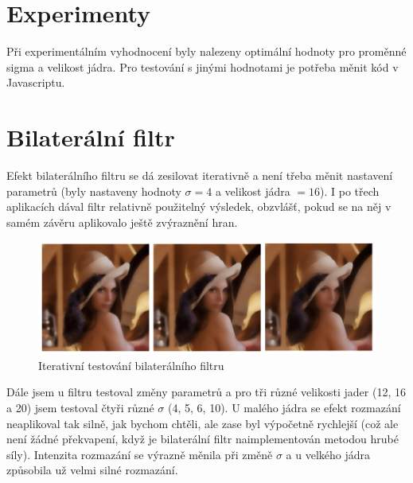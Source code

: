\documentclass[11pt,oneside]{article}
\begin{document}
\clearpage

\section{Experimenty}

Při experimentálním vyhodnocení byly nalezeny optimální hodnoty pro proměnné sigma a velikost jádra. Pro testování s jinými hodnotami je potřeba měnit kód v Javascriptu.

\section{Bilaterální filtr}

Efekt bilaterálního filtru se dá zesilovat iterativně a není třeba měnit nastavení parametrů (byly nastaveny hodnoty $\sigma = 4$ a velikost jádra $= 16$). I po třech aplikacích dával filtr relativně použitelný výsledek, obzvlášť, pokud se na něj v samém závěru aplikovalo ještě zvýraznění hran.

\begin{figure}[!htb]
\centering
\includegraphics[width=1.0\textwidth]{bilateral-iterative.png}
\caption{Iterativní testování bilaterálního filtru}
\end{figure}

Dále jsem u filtru testoval změny parametrů a pro tři různé velikosti jader (12, 16 a 20) jsem testoval čtyři různé $\sigma$ (4, 5, 6, 10). U malého jádra se efekt rozmazání neaplikoval tak silně, jak bychom chtěli, ale zase byl výpočetně rychlejší (což ale není žádné překvapení, když je bilaterální filtr naimplementován metodou hrubé síly). Intenzita rozmazání se výrazně měnila při změně $\sigma$ a u velkého jádra způsobila už velmi silné rozmazání.
\end{document}
